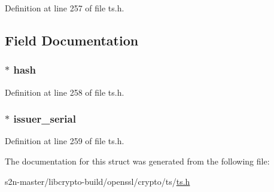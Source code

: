 Definition at line 257 of file ts.\+h.



\subsection{Field Documentation}
\subsubsection[{\texorpdfstring{hash}{hash}}]{ $\ast$ {\bf hash}}\hypertarget{struct_e_s_s__cert__id_acb07a00481518925c973a02fd52209d3}{}\label{struct_e_s_s__cert__id_acb07a00481518925c973a02fd52209d3}


Definition at line 258 of file ts.\+h.

\subsubsection[{\texorpdfstring{issuer\+\_\+serial}{issuer_serial}}]{ $\ast$ issuer\+\_\+serial}\hypertarget{struct_e_s_s__cert__id_a05d32c5c150d087c86bee956d63326ff}{}\label{struct_e_s_s__cert__id_a05d32c5c150d087c86bee956d63326ff}


Definition at line 259 of file ts.\+h.



The documentation for this struct was generated from the following file\+:\begin{DoxyCompactItemize}
\item 
s2n-\/master/libcrypto-\/build/openssl/crypto/ts/\hyperlink{crypto_2ts_2ts_8h}{ts.\+h}\end{DoxyCompactItemize}
